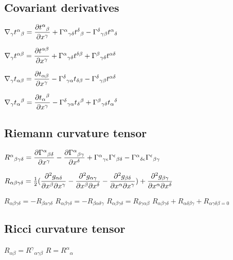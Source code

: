 		\subsection{Covariant derivatives}
\begin{itemize}
\itemt \( \nabla_\gamma t^\alpha{}_\beta = \dfrac{\partial t^\alpha{}_\beta}{\partial x^\gamma} + \Gamma^\alpha{}_{\gamma\delta}t^\delta{}_\beta - \Gamma^\delta{}_{\gamma\beta}t^\alpha{}_\delta \)

\itemt \( \nabla_\gamma t^{\alpha\beta} = \dfrac{\partial t^{\alpha\beta}}{\partial x^\gamma} + \Gamma^\alpha{}_{\gamma\delta}t^{\delta\beta} + \Gamma^\beta{}_{\gamma\delta}t^{\alpha{}\delta} \)

\itemt \( \nabla_\gamma t_{\alpha\beta} = \dfrac{\partial t_{\alpha\beta}}{\partial x^\gamma} - \Gamma^\delta{}_{\gamma\alpha}t_{\delta\beta} - \Gamma^\delta{}_{\gamma\beta}t^{\alpha\delta} \)

\itemt \( \nabla_\gamma t_\alpha{}^\beta = \dfrac{\partial t_\alpha{}^\beta}{\partial x^\gamma} - \Gamma^\delta{}_{\gamma\alpha}t_\delta{}^\beta + \Gamma^\beta{}_{\gamma\delta}t_\alpha{}^\delta \)
\end{itemize}

		\subsection{Riemann curvature tensor}
\begin{itemize}
\itemt \( R^\alpha{}_{\beta\gamma\delta} = \dfrac{\partial \Gamma^\alpha{}_{\beta\delta}}{\partial x^\gamma} - \dfrac{\partial \Gamma^\alpha{}_{\beta\gamma}}{\partial x^\delta} + \Gamma^\alpha{}_{\gamma\epsilon}\Gamma^\epsilon{}_{\beta\delta} - \Gamma^\alpha{}_{\delta\epsilon}\Gamma^\epsilon{}_{\beta\gamma} \)

\itemt \( R_{\alpha\beta\gamma\delta} = \frac{1}{2}(\dfrac{\partial ^2g_{\alpha\delta}}{\partial x^\beta \partial x^\gamma} - \dfrac{\partial ^2g_{\alpha\gamma}}{\partial x^\beta \partial x^\delta} - \dfrac{\partial ^2g_{\beta\delta}}{\partial x^\alpha \partial x^\gamma}) + \dfrac{\partial ^2g_{\beta\gamma}}{\partial x^\alpha \partial x^\delta}\)

\itemt \( R_{\alpha\beta\gamma\delta} = -R_{\beta\alpha\gamma\delta} \)
\itemt \( R_{\alpha\beta\gamma\delta} = -R_{\beta\alpha\delta\gamma} \)
\itemt \( R_{\alpha\beta\gamma\delta} = R_{\delta\gamma\alpha\beta} \)
\itemt \( R_{\alpha\beta\gamma\delta} + R_{\alpha\delta\beta\gamma} + R_{\alpha\gamma\delta\beta = 0}\)

\end{itemize}

		\subsection{Ricci curvature tensor}
\begin{itemize}
\itemt \( R_{\alpha\beta} = R^\gamma{}_{\alpha\gamma\beta} \)
\itemt \( R = R^\alpha{}_\alpha  \)
\end{itemize}


